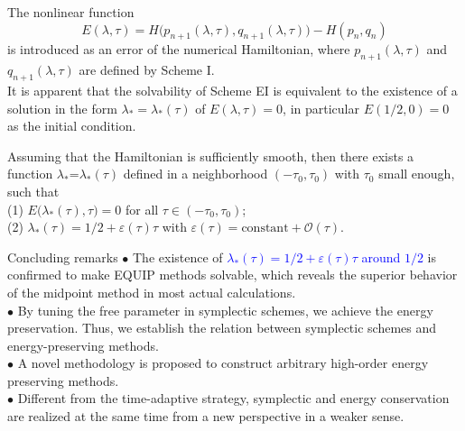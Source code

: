 \documentclass[10pt]{beamer}
\begin{document}
\begin{frame}
The nonlinear function
\begin{equation}\label{eq-28}
E(\lambda,\tau)=H\big(p_{n+1}(\lambda,\tau),q_{n+1}(\lambda,\tau)\big)-H(p_n,q_n)
\end{equation}
is introduced as an error of the numerical Hamiltonian, where $p_{n+1}(\lambda,\tau)$ and $q_{n+1}(\lambda,\tau )$ are defined by Scheme I.\\
\vspace{4mm}
It is apparent that the solvability of Scheme EI is equivalent to the existence of a solution in the form $\lambda_*=\lambda_*(\tau)$ of $E(\lambda,\tau)=0$, in particular $E(1/2,0)=0$ as the initial condition.\\
\vspace{4mm}
\begin{theorem}
Assuming that the Hamiltonian is sufficiently smooth, then there exists a function $\lambda_*$=$\lambda_*(\tau)$ defined in a neighborhood $(-\tau_0,\tau_0)$ with $\tau_0$ small enough, such that\\
\vspace{1mm}
\quad (1) $E\big(\lambda_*(\tau),\tau\big)=0$ for all $\tau \in (-\tau_0,\tau_0)$;\\
\vspace{1mm}
\quad (2) $\lambda_*(\tau)=1/2+\varepsilon(\tau)\tau$ with $\varepsilon(\tau)=\text{constant}+\mathcal{O}(\tau)$.
\end{theorem} 
\end{frame}

\begin{frame}{Concluding remarks}
\quad\textcolor[rgb]{0,0,1}{$\bullet$} The existence of \textcolor{blue}{$\lambda_*(\tau)=1/2+\varepsilon(\tau)\tau$ around $1/2$} is confirmed to make EQUIP methods solvable, which reveals the superior behavior of the midpoint method in most actual calculations.\\  
\vspace{4mm}
\quad\textcolor[rgb]{0,0,1}{$\bullet$} By tuning the free parameter in symplectic schemes, we achieve the energy preservation. Thus, we establish the relation between symplectic schemes and energy-preserving methods.\\
\vspace{4mm}
\quad\textcolor[rgb]{0,0,1}{$\bullet$} A novel methodology is proposed to construct arbitrary high-order energy preserving methods.\\
\vspace{4mm}
\quad\textcolor[rgb]{0,0,1}{$\bullet$} Different from the time-adaptive strategy, symplectic and energy conservation are realized at the same time from a new perspective in a weaker sense.
\end{frame}
\end{document}
